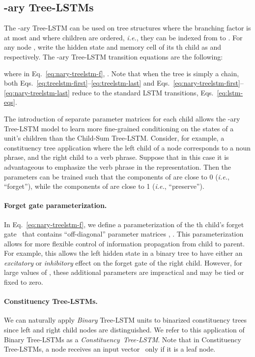 \documentclass[11pt]{article}
\begin{document}
\subsection{-ary Tree-LSTMs}
\label{sec:nary-treelstms}

The -ary Tree-LSTM can be used on tree structures where the branching factor is at most  and where children are ordered, \emph{i.e.}, they can be indexed from  to . For any node , write the hidden state and memory cell of its th child as  and  respectively. The -ary Tree-LSTM transition equations are the following:

where in Eq.~\ref{eq:nary-treelstm-f}, . Note that when the tree is simply a chain, both Eqs.~\ref{eq:treelstm-first}--\ref{eq:treelstm-last} and Eqs.~\ref{eq:nary-treelstm-first}--\ref{eq:nary-treelstm-last} reduce to the standard LSTM transitions, Eqs.~\ref{eq:lstm-eqs}.

The introduction of separate parameter matrices for each child  allows the -ary Tree-LSTM model to learn more fine-grained conditioning on the states of a unit's children than the Child-Sum Tree-LSTM. Consider, for example, a constituency tree application where the left child of a node corresponds to a noun phrase, and the right child to a verb phrase. Suppose that in this case it is advantageous to emphasize the verb phrase in the representation. Then the  parameters can be trained such that the components of  are close to 0 (\emph{i.e.}, ``forget''), while the components of  are close to 1 (\emph{i.e.}, ``preserve'').

\paragraph{Forget gate parameterization.} In Eq.~\ref{eq:nary-treelstm-f}, we define a parameterization of the th child's forget gate~ that contains ``off-diagonal'' parameter matrices , . This parameterization allows for more flexible control of information propagation from child to parent. For example, this allows the left hidden state in a binary tree to have either an \emph{excitatory} or \emph{inhibitory} effect on the forget gate of the right child. However, for large values of , these additional parameters are impractical and may be tied or fixed to zero.

\paragraph{Constituency Tree-LSTMs.} We can naturally apply \emph{Binary} Tree-LSTM units to binarized constituency trees since left and right child nodes are distinguished. We refer to this application of Binary Tree-LSTMs as a \mbox{\emph{Constituency Tree-LSTM}}. Note that in Constituency Tree-LSTMs, a node  receives an input vector~ only if it is a leaf node.
\end{document}
